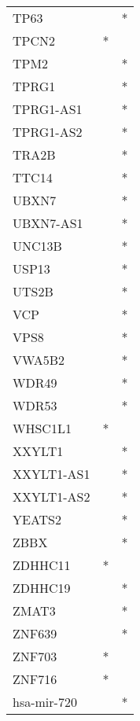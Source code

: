\begin{longtable}{lcc}
TP63             &                &          * \\
TPCN2            &              * &            \\
TPM2             &                &          * \\
TPRG1            &                &          * \\
TPRG1-AS1        &                &          * \\
TPRG1-AS2        &                &          * \\
TRA2B            &                &          * \\
TTC14            &                &          * \\
UBXN7            &                &          * \\
UBXN7-AS1        &                &          * \\
UNC13B           &                &          * \\
USP13            &                &          * \\
UTS2B            &                &          * \\
VCP              &                &          * \\
VPS8             &                &          * \\
VWA5B2           &                &          * \\
WDR49            &                &          * \\
WDR53            &                &          * \\
WHSC1L1          &              * &            \\
XXYLT1           &                &          * \\
XXYLT1-AS1       &                &          * \\
XXYLT1-AS2       &                &          * \\
YEATS2           &                &          * \\
ZBBX             &                &          * \\
ZDHHC11          &              * &            \\
ZDHHC19          &                &          * \\
ZMAT3            &                &          * \\
ZNF639           &                &          * \\
ZNF703           &              * &            \\
ZNF716           &              * &            \\
hsa-mir-720      &                &          * \\
\end{longtable}
